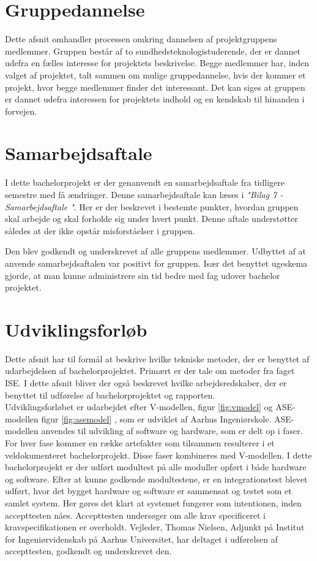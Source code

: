 \chapter{Gruppedannelse}
Dette afsnit omhandler processen omkring dannelsen af projektgruppens medlemmer. Gruppen består af to sundhedsteknologistuderende, der er dannet udefra en fælles interesse for projektets beskrivelse. Begge medlemmer har, inden valget af projektet, talt sammen om mulige gruppedannelse, hvis der kommer et projekt, hvor begge medlemmer finder det interessant. Det kan siges at gruppen er dannet udefra interessen for projektets indhold og en kendskab til hinanden i forvejen.     



\chapter{Samarbejdsaftale}
I dette bachelorprojekt er der genanvendt en samarbejdsaftale fra tidligere semestre med få ændringer. Denne samarbejdsaftale kan læses i \textit{"Bilag 7 - Samarbejdsaftale "}. Her er der beskrevet i bestemte punkter, hvordan gruppen skal arbejde og skal forholde sig under hvert punkt. Denne aftale understøtter således at der ikke opstår misforståelser i gruppen. 

Den blev godkendt og underskrevet af alle gruppens medlemmer. Udbyttet af at anvende samarbejdsaftalen var positivt for gruppen. Især det benyttet ugeskema gjorde, at man kunne administrere sin tid bedre med fag udover bachelor projektet. 



\chapter{Udviklingsforløb}

Dette afsnit har til formål at beskrive hvilke tekniske metoder, der er benyttet af udarbejdelsen af bachelorprojektet. Primært er der tale om metoder fra faget ISE. I dette afsnit bliver der også beskrevet hvilke arbejdsredskaber, der er benyttet til udførelse af bachelorprojektet og rapporten.\\

Udviklingsforløbet er udarbejdet efter V-modellen, figur \ref{fig:vmodel} og ASE-modellen figur \ref{fig:asemodel} \cite{IngeniorhojskolenAarhusUniversiteta}, som er udviklet af Aarhus Ingeniørskole. ASE-modellen anvendes til udvikling af software og hardware, som er delt op i faser. For hver fase kommer en række artefakter som tilsammen resulterer i et veldokumenteret bachelorprojekt. Disse faser kombineres med V-modellen. I dette bachelorprojekt er der udført modultest på alle moduller opført i både hardware og software. Efter at kunne godkende modultestene, er en integrationstest blevet udført, hvor det bygget hardware og software er sammensat og testet som et samlet system. Her gøres det klart at systemet fungerer som intentionen, inden accepttesten nåes. Accepttesten undersøger om alle krav specificeret i kravspecifikationen er overholdt. Vejleder, Thomas Nielsen, Adjunkt på Institut for Ingeniørvidenskab på Aarhus Universitet, har deltaget i udførelsen af accepttesten, godkendt og underskrevet den. 

